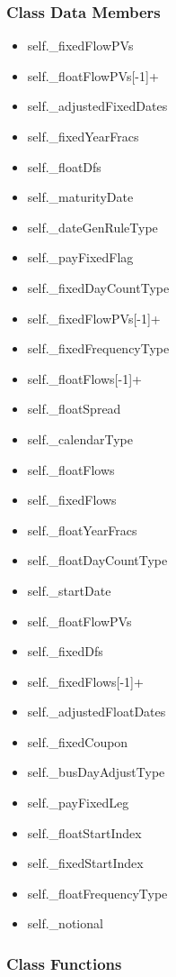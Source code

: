 \documentclass[twoside,11pt]{book}
\begin{document}
\subsubsection{Class Data Members}
\begin{itemize}
\item{self.\_fixedFlowPVs}
\item{self.\_floatFlowPVs[-1]+}
\item{self.\_adjustedFixedDates}
\item{self.\_fixedYearFracs}
\item{self.\_floatDfs}
\item{self.\_maturityDate}
\item{self.\_dateGenRuleType}
\item{self.\_payFixedFlag}
\item{self.\_fixedDayCountType}
\item{self.\_fixedFlowPVs[-1]+}
\item{self.\_fixedFrequencyType}
\item{self.\_floatFlows[-1]+}
\item{self.\_floatSpread}
\item{self.\_calendarType}
\item{self.\_floatFlows}
\item{self.\_fixedFlows}
\item{self.\_floatYearFracs}
\item{self.\_floatDayCountType}
\item{self.\_startDate}
\item{self.\_floatFlowPVs}
\item{self.\_fixedDfs}
\item{self.\_fixedFlows[-1]+}
\item{self.\_adjustedFloatDates}
\item{self.\_fixedCoupon}
\item{self.\_busDayAdjustType}
\item{self.\_payFixedLeg}
\item{self.\_floatStartIndex}
\item{self.\_fixedStartIndex}
\item{self.\_floatFrequencyType}
\item{self.\_notional}
\end{itemize}

\subsubsection{Class Functions}
\end{document}
